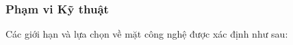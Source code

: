
\subsubsection{Phạm vi Kỹ thuật}

Các giới hạn và lựa chọn về mặt công nghệ được xác định như sau:

